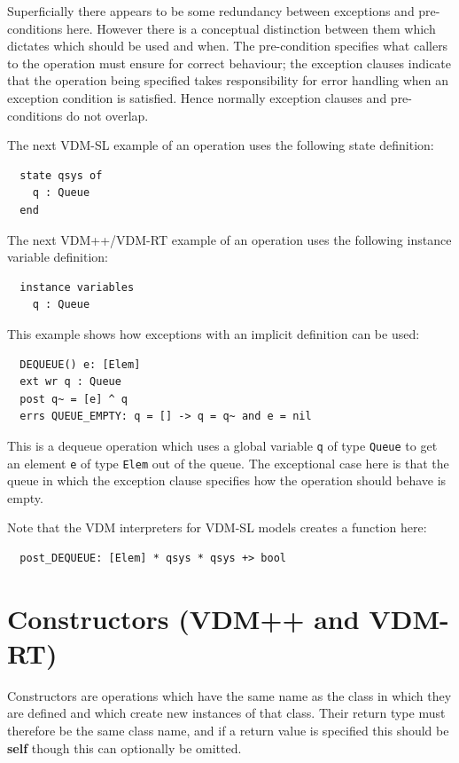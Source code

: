 \documentclass{overturerepchap}
\newcommand{\keyw}[1]{{\bf\ttfamily #1}}
\begin{document}
\begin{description}
Superficially there appears to be some redundancy between exceptions
and pre-conditions here. However there is a conceptual distinction
between them which dictates which should be used and when. The
pre-condition specifies what callers  to the operation must ensure for
correct behaviour; the exception clauses indicate that the operation
being specified takes responsibility for error handling when an
exception condition is satisfied. Hence normally exception clauses and
pre-conditions do not overlap.

The next VDM-SL example of an operation uses the following state definition:
\begin{lstlisting}
  state qsys of
    q : Queue
  end
\end{lstlisting}    

The next VDM++/VDM-RT example of an operation uses the following
instance variable definition:
\begin{lstlisting}
  instance variables
    q : Queue
\end{lstlisting}    

This example shows how exceptions with an implicit definition can be used:
\begin{lstlisting}
  DEQUEUE() e: [Elem]
  ext wr q : Queue
  post q~ = [e] ^ q
  errs QUEUE_EMPTY: q = [] -> q = q~ and e = nil
\end{lstlisting}

This is a dequeue operation which uses a global variable {\tt q} of
type {\tt Queue} to get an element {\tt e} of type {\tt Elem} out of
the queue. The exceptional case here is that the queue in
which the exception clause specifies how the operation should
behave is empty.

Note that the VDM interpreters for VDM-SL models creates a function here:
\begin{lstlisting}
  post_DEQUEUE: [Elem] * qsys * qsys +> bool
\end{lstlisting}

\end{description}


\section{Constructors (VDM++ and VDM-RT)}\label{constructors}

Constructors are operations which have the same name as the class in
which they are defined and which create new instances of that
class. Their return type must therefore be the same class
name, and if a return value is specified this should be \keyw{self}
though this can optionally be omitted.
\end{document}
